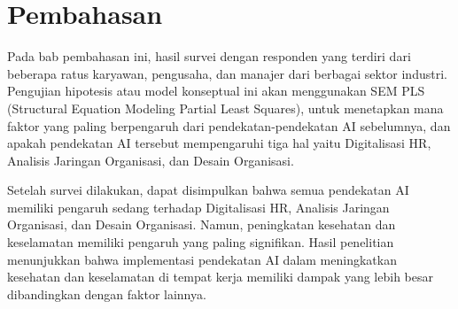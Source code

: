 \documentclass[12pt]{article}
\begin{document}



\section*{Pembahasan}
Pada bab pembahasan ini, hasil survei dengan responden yang terdiri dari beberapa ratus karyawan, pengusaha, dan manajer dari berbagai sektor industri.  Pengujian hipotesis atau model konseptual  ini akan menggunakan SEM PLS (Structural Equation Modeling Partial Least Squares), untuk menetapkan mana faktor yang paling berpengaruh dari pendekatan-pendekatan AI sebelumnya, dan apakah pendekatan AI tersebut mempengaruhi tiga hal yaitu Digitalisasi HR, Analisis Jaringan Organisasi, dan Desain Organisasi.

Setelah survei dilakukan, dapat disimpulkan bahwa semua pendekatan AI memiliki pengaruh sedang terhadap Digitalisasi HR, Analisis Jaringan Organisasi, dan Desain Organisasi. Namun, peningkatan kesehatan dan keselamatan memiliki pengaruh yang paling signifikan. Hasil penelitian menunjukkan bahwa implementasi pendekatan AI dalam meningkatkan kesehatan dan keselamatan di tempat kerja memiliki dampak yang lebih besar dibandingkan dengan faktor lainnya.
\end{document}
